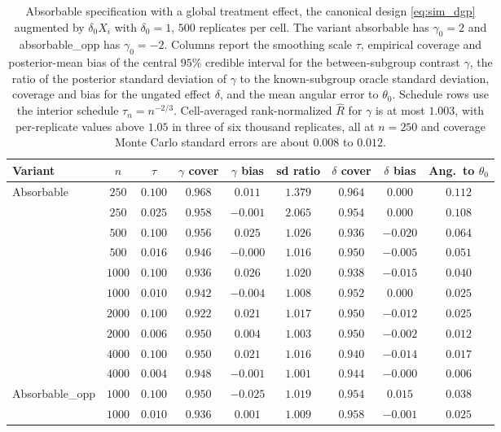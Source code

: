 \documentclass[11pt]{article}
\theoremstyle{definition}
\theoremstyle{plain}
\begin{document}
\begin{table}[!htbp]
  \centering
  \caption{Absorbable specification with a global treatment effect, the canonical design \eqref{eq:sim_dgp} augmented by $\delta_0 X_i$ with $\delta_0=1$, $500$ replicates per cell. The variant \textup{absorbable} has $\gamma_0=2$ and \textup{absorbable\_opp} has $\gamma_0=-2$. Columns report the smoothing scale $\tau$, empirical coverage and posterior-mean bias of the central $95\%$ credible interval for the between-subgroup contrast $\gamma$, the ratio of the posterior standard deviation of $\gamma$ to the known-subgroup oracle standard deviation, coverage and bias for the ungated effect $\delta$, and the mean angular error to $\theta_0$. Schedule rows use the interior schedule $\tau_n=n^{-2/3}$. Cell-averaged rank-normalized $\widehat R$ for $\gamma$ is at most $1.003$, with per-replicate values above $1.05$ in three of six thousand replicates, all at $n=250$ and coverage Monte Carlo standard errors are about $0.008$ to $0.012$.}
  \label{tab:sim_absorbable}
  \begin{adjustbox}{max width=\textwidth}
  \begin{tabular}{l c c cc c cc c}
    \toprule
    Variant & $n$ & $\tau$ & $\gamma$ cover & $\gamma$ bias & sd ratio & $\delta$ cover & $\delta$ bias & Ang.\ to $\theta_0$\\
    \midrule
    \multirow{10}{*}{Absorbable}
      & $250$  & $0.100$ & $0.968$ & $0.011$  & $1.379$ & $0.964$ & $0.000$  & $0.112$\\
      & $250$  & $0.025$ & $0.958$ & $-0.001$ & $2.065$ & $0.954$ & $0.000$  & $0.108$\\
      & $500$  & $0.100$ & $0.956$ & $0.025$  & $1.026$ & $0.936$ & $-0.020$ & $0.064$\\
      & $500$  & $0.016$ & $0.946$ & $-0.000$ & $1.016$ & $0.950$ & $-0.005$ & $0.051$\\
      & $1000$ & $0.100$ & $0.936$ & $0.026$  & $1.020$ & $0.938$ & $-0.015$ & $0.040$\\
      & $1000$ & $0.010$ & $0.942$ & $-0.004$ & $1.008$ & $0.952$ & $0.000$  & $0.025$\\
      & $2000$ & $0.100$ & $0.922$ & $0.021$  & $1.017$ & $0.950$ & $-0.012$ & $0.025$\\
      & $2000$ & $0.006$ & $0.950$ & $0.004$  & $1.003$ & $0.950$ & $-0.002$ & $0.012$\\
      & $4000$ & $0.100$ & $0.950$ & $0.021$  & $1.016$ & $0.940$ & $-0.014$ & $0.017$\\
      & $4000$ & $0.004$ & $0.948$ & $-0.001$ & $1.001$ & $0.944$ & $-0.000$ & $0.006$\\
    \midrule
    \multirow{2}{*}{Absorbable\_opp}
      & $1000$ & $0.100$ & $0.950$ & $-0.025$ & $1.019$ & $0.954$ & $0.015$  & $0.038$\\
      & $1000$ & $0.010$ & $0.936$ & $0.001$  & $1.009$ & $0.958$ & $-0.001$ & $0.025$\\
    \bottomrule
  \end{tabular}
  \end{adjustbox}
\end{table}
\end{document}
